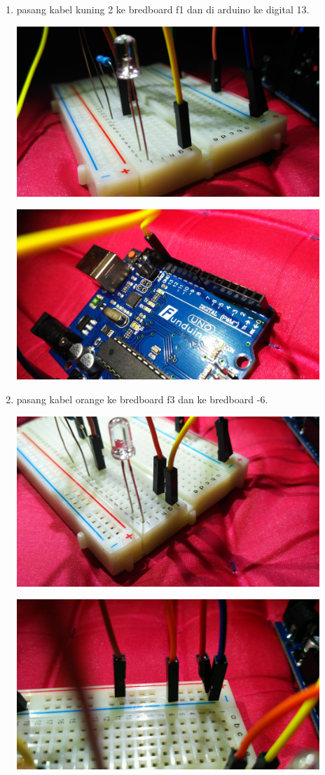 \begin{enumerate}
	\break
	\item pasang kabel kuning 2 ke bredboard f1 dan di arduino ke digital 13.
	\break
	\centerline{\includegraphics[width=0.9\textwidth]{figures/13.jpg}}
	\break
	\centerline{\includegraphics[width=0.9\textwidth]{figures/14.jpg}}
	\break
	\item pasang kabel orange ke bredboard f3 dan ke bredboard -6.
	\break
	\centerline{\includegraphics[width=0.9\textwidth]{figures/15.jpg}}
	\break
	\centerline{\includegraphics[width=0.9\textwidth]{figures/16.jpg}}

\end{enumerate}
